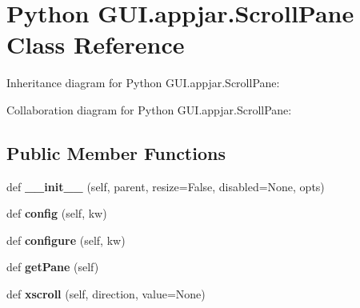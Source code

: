 \hypertarget{class_python_01_g_u_i_1_1appjar_1_1_scroll_pane}{}\section{Python G\+U\+I.\+appjar.\+Scroll\+Pane Class Reference}
\label{class_python_01_g_u_i_1_1appjar_1_1_scroll_pane}


Inheritance diagram for Python G\+U\+I.\+appjar.\+Scroll\+Pane\+:


Collaboration diagram for Python G\+U\+I.\+appjar.\+Scroll\+Pane\+:
\subsection*{Public Member Functions}
\begin{DoxyCompactItemize}
\item 
\mbox{\label{class_python_01_g_u_i_1_1appjar_1_1_scroll_pane_a2cf65eb02190e3965caae5c5ebabdf1a}} 
def {\bfseries \+\_\+\+\_\+init\+\_\+\+\_\+} (self, parent, resize=False, disabled=None, opts)
\item 
\mbox{\label{class_python_01_g_u_i_1_1appjar_1_1_scroll_pane_aa3b22c9660993e460ed16afd8aa24d27}} 
def {\bfseries config} (self, kw)
\item 
\mbox{\label{class_python_01_g_u_i_1_1appjar_1_1_scroll_pane_a44ab562378aac66af793d050202f0cc5}} 
def {\bfseries configure} (self, kw)
\item 
\mbox{\label{class_python_01_g_u_i_1_1appjar_1_1_scroll_pane_af9d73e762aef0b570f7090325c639ebe}} 
def {\bfseries get\+Pane} (self)
\item 
\mbox{\label{class_python_01_g_u_i_1_1appjar_1_1_scroll_pane_a0b5f7224a72da8854e95f69dfef87c3f}} 
def {\bfseries xscroll} (self, direction, value=None)
\item 
\mbox{\label{class_python_01_g_u_i_1_1appjar_1_1_scroll_pane_a8f17c2c9ff952ba62297cbcd4f1a6028}} 

\end{DoxyCompactItemize}
